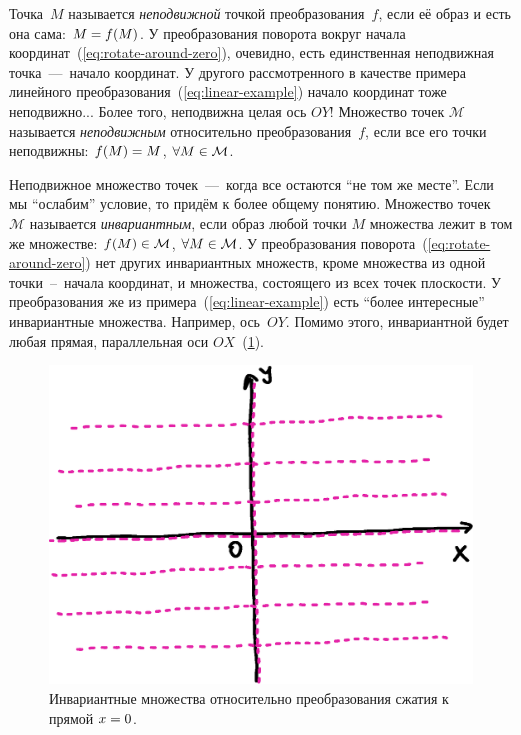 \documentclass[a4paper,12pt]{article}
\begin{document}
  Точка~$M$ называется \emph{неподвижной} точкой преобразования~$f$, если её образ и есть она сама: $M \hm= f(M)$.
  У преобразования поворота вокруг начала координат~(\ref{eq:rotate-around-zero}), очевидно, есть единственная неподвижная точка~---~начало координат.
  У другого рассмотренного в качестве примера линейного преобразования~(\ref{eq:linear-example}) начало координат тоже неподвижно...
  Более того, неподвижна целая ось $OY$!
  Множество точек $\mathcal M$ называется \emph{неподвижным} относительно преобразования~$f$, если все его точки неподвижны: $f(M) \hm= M$, $\forall M \hm\in \mathcal M$.
  
  Неподвижное множество точек~---~когда все остаются ``не том же месте''.
  Если мы ``ослабим'' условие, то придём к более общему понятию.
  Множество точек~$\mathcal M$ называется \emph{инвариантным}, если образ любой точки $M$ множества лежит в том же множестве: $f(M) \hm\in \mathcal M$, $\forall M \hm\in \mathcal M$.
  У преобразования поворота~(\ref{eq:rotate-around-zero}) нет других инвариантных множеств, кроме множества из одной точки~--~начала координат, и множества, состоящего из всех точек плоскости.
  У преобразования же из примера~(\ref{eq:linear-example}) есть ``более интересные'' инвариантные множества.
  Например, ось~$OY$.
  Помимо этого, инвариантной будет любая прямая, параллельная оси $OX$~(\ref{fig:linear-example-inv}).
  
  \begin{figure}
      \centering
      
      \includegraphics[width=0.8\columnwidth]{linear-example-inv}
      
      \caption{Инвариантные множества относительно преобразования сжатия к прямой $x \hm= 0$.}
      \label{fig:linear-example-inv}
    \end{figure}
  
\end{document}
